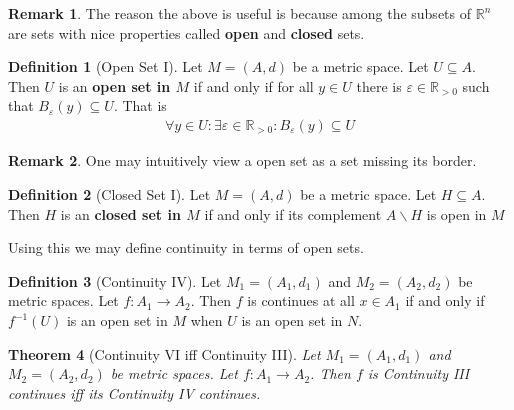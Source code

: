 \documentclass{article}
\theoremstyle{plain}
\newtheorem{theorem}{Theorem}
\theoremstyle{definition}
\newtheorem*{remark}{Remark}
\newtheorem{definition}[theorem]{Definition}
\newcommand{\R}{\mathbb{R}}
\begin{document}
\begin{remark}
	The reason the above is useful is because among the subsets of $\R^n$ are
	sets with nice properties called \textbf{open} and \textbf{closed} sets.
\end{remark}
\begin{definition}[Open Set I]
	Let $M=(A,d)$ be a metric space. Let $U\subseteq A$. Then $U$ is an
	\textbf{open set in $M$} if and only if for all $y\in U$ there is
	$\varepsilon\in\R_{>0}$ such that $B_{\varepsilon}(y)\subseteq U$. That is
	\begin{equation}
	\begin{aligned}
		\forall y\in U:\exists\varepsilon\in\R_{>0}: 
		B_{\varepsilon}(y)\subseteq U
	\end{aligned}
	\end{equation}
\end{definition}
\begin{remark}
	One may intuitively view a open set as a set missing its border.
\end{remark}
\begin{definition}[Closed Set I]
	Let $M=(A,d)$ be a metric space. Let $H\subseteq A$. Then $H$
	is an \textbf{closed set in $M$} if and only if its complement
	$A\backslash H$ is open in $M$
\end{definition}
Using this we may define continuity in terms of open sets.
\begin{definition}[Continuity IV]
	Let $M_1=(A_1,d_1)$ and $M_2=(A_2,d_2)$ be metric spaces. Let
	$f:A_1\rightarrow A_2$. Then $f$ is continues at all $x\in A_1$
	if and only if $f^{-1}(U)$ is an open set in $M$ when $U$ is an
	open set in $N$.
\end{definition}
\begin{theorem}[Continuity VI iff Continuity III]
	Let $M_1=(A_1,d_1)$ and $M_2=(A_2,d_2)$ be metric spaces. Let
	$f:A_1\rightarrow A_2$. Then $f$ is Continuity III continues iff its
	Continuity IV continues.
\end{theorem}
\end{document}

